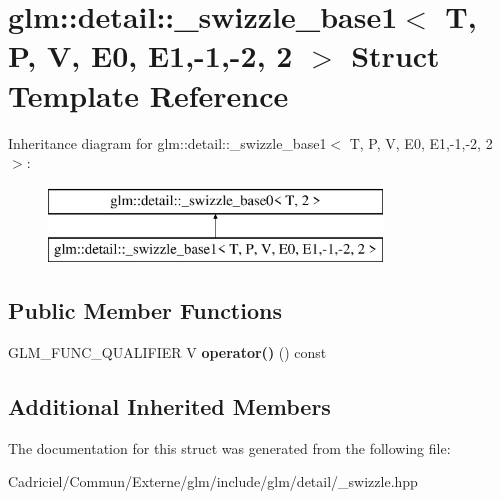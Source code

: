 \hypertarget{structglm_1_1detail_1_1__swizzle__base1_3_01_t_00_01_p_00_01_v_00_01_e0_00_01_e1_00-1_00-2_00_012_01_4}{}\section{glm\+:\+:detail\+:\+:\+\_\+swizzle\+\_\+base1$<$ T, P, V, E0, E1,-\/1,-\/2, 2 $>$ Struct Template Reference}
\label{structglm_1_1detail_1_1__swizzle__base1_3_01_t_00_01_p_00_01_v_00_01_e0_00_01_e1_00-1_00-2_00_012_01_4}
Inheritance diagram for glm\+:\+:detail\+:\+:\+\_\+swizzle\+\_\+base1$<$ T, P, V, E0, E1,-\/1,-\/2, 2 $>$\+:\begin{figure}[H]
\begin{center}
\leavevmode
\includegraphics[height=2.000000cm]{structglm_1_1detail_1_1__swizzle__base1_3_01_t_00_01_p_00_01_v_00_01_e0_00_01_e1_00-1_00-2_00_012_01_4}
\end{center}
\end{figure}
\subsection*{Public Member Functions}
\begin{DoxyCompactItemize}
\item 
G\+L\+M\+\_\+\+F\+U\+N\+C\+\_\+\+Q\+U\+A\+L\+I\+F\+I\+ER V {\bfseries operator()} () const \hypertarget{structglm_1_1detail_1_1__swizzle__base1_3_01_t_00_01_p_00_01_v_00_01_e0_00_01_e1_00-1_00-2_00_012_01_4_a333b1c869374c290a8bca707a258f5e5}{}\label{structglm_1_1detail_1_1__swizzle__base1_3_01_t_00_01_p_00_01_v_00_01_e0_00_01_e1_00-1_00-2_00_012_01_4_a333b1c869374c290a8bca707a258f5e5}

\end{DoxyCompactItemize}
\subsection*{Additional Inherited Members}


The documentation for this struct was generated from the following file\+:\begin{DoxyCompactItemize}
\item 
Cadriciel/\+Commun/\+Externe/glm/include/glm/detail/\+\_\+swizzle.\+hpp\end{DoxyCompactItemize}
